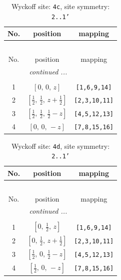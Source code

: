 \documentclass[fleqn,8pt]{jsarticle}
\begin{document}
\renewcommand{\arraystretch}{1.2}
\begin{longtable}{ccc}
\caption{Wyckoff site: {\tt 4c}, site symmetry: {\tt 2..1'}}
 \\
 \hline \hline
No. & position & mapping \\ \hline \endfirsthead

\multicolumn{2}{l}{\tablename\ \thetable{}} \\
 \hline \hline
No. & position & mapping \\ \hline \endhead

 \hline \hline
\multicolumn{2}{r}{\footnotesize\it continued ...} \\ \endfoot

 \hline \hline
\multicolumn{2}{r}{} \\ \endlastfoot

1 & $\left[ 0,\, 0,\, z \right]$ & {\tt [1,6,9,14]} \\ \hline
2 & $\left[ \frac{1}{2},\, \frac{1}{2},\, z + \frac{1}{2} \right]$ & {\tt [2,3,10,11]} \\ \hline
3 & $\left[ \frac{1}{2},\, \frac{1}{2},\, \frac{1}{2} - z \right]$ & {\tt [4,5,12,13]} \\ \hline
4 & $\left[ 0,\, 0,\, - z \right]$ & {\tt [7,8,15,16]} \\
\end{longtable}
\renewcommand{\arraystretch}{1.2}
\begin{longtable}{ccc}
\caption{Wyckoff site: {\tt 4d}, site symmetry: {\tt 2..1'}}
 \\
 \hline \hline
No. & position & mapping \\ \hline \endfirsthead

\multicolumn{2}{l}{\tablename\ \thetable{}} \\
 \hline \hline
No. & position & mapping \\ \hline \endhead

 \hline \hline
\multicolumn{2}{r}{\footnotesize\it continued ...} \\ \endfoot

 \hline \hline
\multicolumn{2}{r}{} \\ \endlastfoot

1 & $\left[ 0,\, \frac{1}{2},\, z \right]$ & {\tt [1,6,9,14]} \\ \hline
2 & $\left[ 0,\, \frac{1}{2},\, z + \frac{1}{2} \right]$ & {\tt [2,3,10,11]} \\ \hline
3 & $\left[ \frac{1}{2},\, 0,\, \frac{1}{2} - z \right]$ & {\tt [4,5,12,13]} \\ \hline
4 & $\left[ \frac{1}{2},\, 0,\, - z \right]$ & {\tt [7,8,15,16]} \\
\end{longtable}
\end{document}
